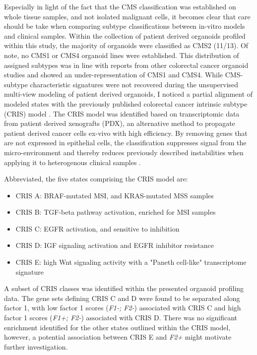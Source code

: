 \begin{flushleft}
Especially in light of the fact that the CMS classification was established on whole tissue samples, and not isolated malignant cells, it becomes clear that care should be take when comparing subtype classifications between in-vitro models and clinical samples. Within the collection of patient derived organoids profiled within this study, the majority of organoids were classified as CMS2 (11/13). Of note, no CMS1 or CMS4 organoid lines were established. This distribution of assigned subtypes was in line with reports from other colorectal cancer organoid studies \parencite{vandeweteringProspectiveDerivationLiving2015, schutteMolecularDissectionColorectal2017} and showed an under-representation of CMS1 and CMS4. While CMS-subtype characteristic signatures were not recovered during the unsupervised multi-view modeling of patient derived organoids, I noticed a partial alignment of modeled states with the previously published colorectal cancer intrinsic subtype (CRIS) model \parencite{isellaSelectiveAnalysisCancercell2017a}. The CRIS model was identified based on transcriptomic data from patient derived xenografts (PDX), an alternative method to propagate patient derived cancer cells ex-vivo with high efficiency. By removing genes that are not expressed in epithelial cells, the classification suppresses signal from the micro-environment and thereby reduces previously described instabilities when applying it to heterogenous clinical samples \parencite{dunneCancercellIntrinsicGene2017}.
\par

Abbreviated, the five states comprising the CRIS model are: 
\begin{itemize} 
    \item CRIS A: BRAF-mutated MSI, and KRAS-mutated MSS samples
    \item CRIS B: TGF-beta pathway activation, enriched for MSI samples 
    \item CRIS C: EGFR activation, and sensitive to inhibition
    \item CRIS D: IGF signaling activation and EGFR inhibitor resistance
    \item CRIS E: high Wnt signaling activity with a "Paneth cell-like" transcriptome signature
\end{itemize}

A subset of CRIS classes was identified within the presented organoid profiling data. The gene sets defining CRIS C and D were found to be separated along factor 1, with low factor 1 scores (\textit{F1-; F2-}) associated with CRIS C and high factor 1 scores (\textit{F1+; F2-}) associated with CRIS D. There was no significant enrichment identified for the other states outlined within the CRIS model, however, a potential association between CRIS E and \textit{F2+} might motivate further investigation.
\par


\end{flushleft}
